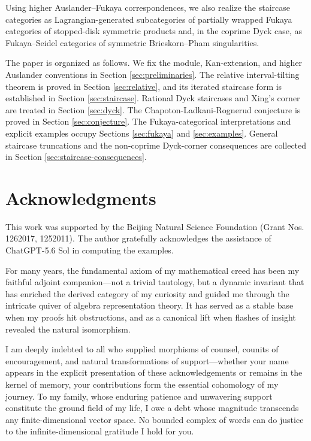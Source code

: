 \documentclass[12pt,a4paper,english,reqno]{amsart}
\theoremstyle{plain}
\theoremstyle{definition}
\begin{document}
Using higher Auslander--Fukaya correspondences, we also realize the staircase
categories as Lagrangian-generated subcategories of partially wrapped Fukaya
categories of stopped-disk symmetric products and, in the coprime Dyck case,
as Fukaya--Seidel categories of symmetric Brieskorn--Pham singularities.


The paper is organized as follows.  We fix the module, Kan-extension, and
higher Auslander conventions in Section \ref{sec:preliminaries}.  The relative
interval-tilting theorem is proved in Section \ref{sec:relative}, and its iterated
staircase form is established in Section \ref{sec:staircase}.  Rational Dyck
staircases and Xing's corner are treated in Section \ref{sec:dyck}.  The
Chapoton-Ladkani-Rognerud conjecture is proved in Section \ref{sec:conjecture}.
The Fukaya-categorical interpretations and explicit examples occupy Sections \ref{sec:fukaya} and \ref{sec:examples}.  General staircase truncations and the
non-coprime Dyck-corner consequences are collected in Section 
\ref{sec:staircase-consequences}.


\section*{Acknowledgments}

This work was supported by the Beijing Natural Science Foundation (Grant Nos. 1262017, 1252011). The author gratefully acknowledges the assistance of ChatGPT-5.6 Sol in computing the examples.

For many years, the fundamental axiom of my mathematical creed has been my faithful adjoint companion—not a trivial tautology, but a dynamic invariant that has enriched the derived category of my curiosity and guided me through the intricate quiver of algebra representation theory. It has served as a stable base when my proofs hit obstructions, and as a canonical lift when flashes of insight revealed the natural isomorphism.

I am deeply indebted to all who supplied morphisms of counsel, counits of encouragement, and natural transformations of support—whether your name appears in the explicit presentation of these acknowledgements or remains in the kernel of memory, your contributions form the essential cohomology of my journey. To my family, whose enduring patience and unwavering support constitute the ground field of my life, I owe a debt whose magnitude transcends any finite-dimensional vector space. No bounded complex of words can do justice to the infinite-dimensional gratitude I hold for you.
\end{document}
